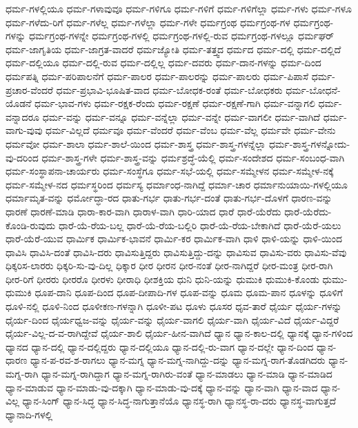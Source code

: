 {ಧರ್ಮ-ಗಳಲ್ಲಿಯೂ
ಧರ್ಮ-ಗಳಾವುವೂ
ಧರ್ಮ-ಗಳಿಗೂ
ಧರ್ಮ-ಗಳಿಗೆ
ಧರ್ಮ-ಗಳಿಗೆಲ್ಲಾ
ಧರ್ಮ-ಗಳು
ಧರ್ಮ-ಗಳೂ
ಧರ್ಮ-ಗಳೆದು-ರಿಗೆ
ಧರ್ಮ-ಗಳೆಲ್ಲ
ಧರ್ಮ-ಗಳೆಲ್ಲಾ
ಧರ್ಮ-ಗಳೇ
ಧರ್ಮಗ್ರಂಥ
ಧರ್ಮಗ್ರಂಥ-ಗಳ
ಧರ್ಮಗ್ರಂಥ-ಗಳನ್ನು
ಧರ್ಮಗ್ರಂಥ-ಗಳನ್ನೇ
ಧರ್ಮಗ್ರಂಥ-ಗಳಲ್ಲಿ
ಧರ್ಮಗ್ರಂಥ-ಗಳಲ್ಲಿ-ರುವ
ಧರ್ಮಗ್ರಂಥ-ಗಳಲ್ಲೂ
ಧರ್ಮಘರ್
ಧರ್ಮ-ಜಾಗೃತಿಯ
ಧರ್ಮ-ಜಾಗ್ರತ-ವಾದರೆ
ಧರ್ಮಜ್ಯೋತಿ
ಧರ್ಮ-ತತ್ತ್ವದ
ಧರ್ಮದ
ಧರ್ಮ-ದಲ್ಲಿ
ಧರ್ಮ-ದಲ್ಲಿದೆ
ಧರ್ಮ-ದಲ್ಲಿಯೂ
ಧರ್ಮ-ದಲ್ಲಿ-ರುವ
ಧರ್ಮ-ದಲ್ಲಿಲ್ಲ
ಧರ್ಮ-ದವರು
ಧರ್ಮ-ದಾನ-ಗಳನ್ನು
ಧರ್ಮ-ದಿಂದ
ಧರ್ಮಪತ್ನಿ
ಧರ್ಮ-ಪರಿಪಾಲನೆಗೆ
ಧರ್ಮ-ಪಾಲರ
ಧರ್ಮ-ಪಾಲರನ್ನು
ಧರ್ಮ-ಪಾಲರು
ಧರ್ಮ-ಪಿಪಾಸೆ
ಧರ್ಮ-ಪ್ರಚಾರ-ವೆಂದರೆ
ಧರ್ಮ-ಪ್ರಭಾವಿ-ಭೂಷಿತ-ವಾದ
ಧರ್ಮ-ಬೋಧಕ-ರಂತೆ
ಧರ್ಮ-ಬೋಧಕರು
ಧರ್ಮ-ಬೋಧನೆ-ಯೊಡನೆ
ಧರ್ಮ-ಭಾವ-ಗಳು
ಧರ್ಮ-ರಕ್ಷಕ-ರೆಂದು
ಧರ್ಮ-ರಕ್ಷಣೆ
ಧರ್ಮ-ರಕ್ಷಣೆ-ಗಾಗಿ
ಧರ್ಮ-ವನ್ನಾಗಲಿ
ಧರ್ಮ-ವನ್ನಾದರೂ
ಧರ್ಮ-ವನ್ನು
ಧರ್ಮ-ವನ್ನೂ
ಧರ್ಮ-ವನ್ನೆಲ್ಲಾ
ಧರ್ಮ-ವನ್ನೇ
ಧರ್ಮ-ವಾಗಲೀ
ಧರ್ಮ-ವಾಗಿದೆ
ಧರ್ಮ-ವಾಗು-ವುವು
ಧರ್ಮ-ವಿಲ್ಲದೆ
ಧರ್ಮವೂ
ಧರ್ಮ-ವೆಂದರೆ
ಧರ್ಮ-ವೆಂಬ
ಧರ್ಮ-ವೆಲ್ಲ
ಧರ್ಮವೇ
ಧರ್ಮ-ವೇನು
ಧರ್ಮವೋ
ಧರ್ಮ-ಶಾಲಾ
ಧರ್ಮ-ಶಾಲೆ-ಯಿಂದ
ಧರ್ಮ-ಶಾಸ್ತ್ರ
ಧರ್ಮ-ಶಾಸ್ತ್ರ-ಗಳನ್ನೆಲ್ಲಾ
ಧರ್ಮ-ಶಾಸ್ತ್ರ-ಗಳನ್ನೋದು-ವು-ದರಿಂದ
ಧರ್ಮ-ಶಾಸ್ತ್ರ-ಗಳೇ
ಧರ್ಮ-ಶಾಸ್ತ್ರ-ವನ್ನು
ಧರ್ಮಶ್ರದ್ಧೆ-ಯೆಲ್ಲಿ
ಧರ್ಮ-ಸಂದೇಶದ
ಧರ್ಮ-ಸಂಬಂಧ-ವಾಗಿ
ಧರ್ಮ-ಸಂಸ್ಥಾಪನಾ-ಚಾರ್ಯರು
ಧರ್ಮ-ಸಂಸ್ಥೆಗೂ
ಧರ್ಮ-ಸಭೆ-ಯಲ್ಲಿ
ಧರ್ಮ-ಸಮ್ಮೇಳನ
ಧರ್ಮ-ಸಮ್ಮೇಳ-ನಕ್ಕೆ
ಧರ್ಮ-ಸಮ್ಮೇಳ-ನದ
ಧರ್ಮಸ್ಥರಿಂದ
ಧರ್ಮಸ್ಯ
ಧರ್ಮಾಂಧ-ನಾಗಿದ್ದೆ
ಧರ್ಮಾ-ಚಾರ
ಧರ್ಮಾನುಯಾಯಿ-ಗಳಲ್ಲಿಯೂ
ಧರ್ಮಾಮೃತ-ವನ್ನು
ಧರ್ಮೋದ್ಧಾ-ರದ
ಧಾತು-ಗರ್ಭ
ಧಾತು-ಗರ್ಭ-ದಂತೆ
ಧಾತು-ಗರ್ಭ-ದೊಳಗೆ
ಧಾರಣ-ವನ್ನು
ಧಾರಣೆ
ಧಾರಣೆ-ಮಾಡಿ
ಧಾರಾ-ಕಾರ-ವಾಗಿ
ಧಾರಾಳ-ವಾಗಿ
ಧಾರಿ-ಯಾದ
ಧಾರೆ
ಧಾರೆ-ಯೆರೆದು
ಧಾರೆ-ಯೆರೆದು-ಕೊಂಡಿ-ರುವುದು
ಧಾರೆ-ಯೆ-ರೆಯ-ಬಲ್ಲ
ಧಾರೆ-ಯೆ-ರೆಯ-ಬಲ್ಲಿರಿ
ಧಾರೆ-ಯೆ-ರೆಯ-ಬೇಕಾಗಿದೆ
ಧಾರೆ-ಯೆರೆ-ಯಲು
ಧಾರೆ-ಯೆರೆ-ಯುವ
ಧಾರ್ಮಿಕ
ಧಾರ್ಮಿಕ-ಭಾವನೆ
ಧಾರ್ಮಿ-ಕರ
ಧಾರ್ಮಿಕ-ವಾಗಿ
ಧಾಳಿ
ಧಾಳಿ-ಯನ್ನು
ಧಾಳಿ-ಯಿಂದ
ಧಾವಿಸಿ
ಧಾವಿಸಿ-ದಂತೆ
ಧಾವಿಸಿ-ದರು
ಧಾವಿಸುತ್ತಿದ್ದರು
ಧಾವಿಸುತ್ತಿದ್ದು-ದನ್ನು
ಧಾವಿಸುವ
ಧಾವಿಸು-ವರು
ಧಾವಿಸು-ವೆವು
ಧಿಕ್ಕರಿಸ-ಲಾರರು
ಧಿಕ್ಕರಿ-ಸು-ವು-ದಿಲ್ಲ
ಧಿಕ್ಕಾರ
ಧೀರ
ಧೀರನ
ಧೀರ-ನಂತೆ
ಧೀರ-ನಾಗಿದ್ದರೆ
ಧೀರ-ಮಂತ್ರ
ಧೀರ-ರಾಗಿ
ಧೀರ-ರಿಗೆ
ಧೀರರು
ಧೀರರೊ
ಧೀರಳು
ಧೀರಾಧಿ
ಧೀಶಕ್ತಿಯ
ಧುನಿ
ಧುನಿ-ಯನ್ನು
ಧುಮುಕಿ
ಧುಮುಕಿ-ಕೊಂಡು
ಧುಮು-ಧುಮುಕಿ
ಧೂಪ-ದಾನಿ
ಧೂಪ-ದಿಂದ
ಧೂಪ-ದೀಪಾದಿ-ಗಳ
ಧೂಪ-ವನ್ನು
ಧೂಮ
ಧೂಮ-ಪಾನ
ಧೂಳನ್ನು
ಧೂಳಿಗೆ
ಧೂಳಿ-ನಲ್ಲಿ
ಧೂಳಿ-ನಿಂದ
ಧೂಳೀಕಣ-ಗಳನ್ನಾಗಿ
ಧೂಳೀ-ಪಟ
ಧೂಳು
ಧೂಸರ
ಧೃವ-ತಾರೆ
ಧೈರ್ಯ
ಧೈರ್ಯ-ಗಳನ್ನು
ಧೈರ್ಯ-ದಿಂದ
ಧೈರ್ಯಧ್ವಜ-ವನ್ನು
ಧೈರ್ಯ-ವನ್ನು
ಧೈರ್ಯ-ವಾಗಲಿ
ಧೈರ್ಯ-ವಾಗಿ
ಧೈರ್ಯ-ವಿದೆ
ಧೈರ್ಯ-ವಿದ್ದರೆ
ಧೈರ್ಯ-ವಿಲ್ಲ-ದ-ವ-ರಾಗಿದ್ದೇವೆ
ಧೈರ್ಯ-ಶಾಲಿ
ಧೈರ್ಯ-ಹೀನ-ವಾಗಿದೆ
ಧ್ಯಾನ
ಧ್ಯಾನ-ಕಾಲ-ದಲ್ಲಿ
ಧ್ಯಾನಕ್ಕೆ
ಧ್ಯಾನ-ಗಳಿಂದ
ಧ್ಯಾನದ
ಧ್ಯಾನ-ದಲ್ಲಿ
ಧ್ಯಾನ-ದಲ್ಲಿದ್ದರು
ಧ್ಯಾನ-ದಲ್ಲಿಯೂ
ಧ್ಯಾನ-ದಲ್ಲಿ-ರು-ವಾಗ
ಧ್ಯಾನ-ದಲ್ಲೇ
ಧ್ಯಾನ-ದಿಂದ
ಧ್ಯಾನ-ಧಾರಣ
ಧ್ಯಾನ-ಪ-ರವ-ಶ-ರಾಗಲು
ಧ್ಯಾನ-ಮಗ್ನ
ಧ್ಯಾನ-ಮಗ್ನ-ನಾಗಿದ್ದು-ದನ್ನು
ಧ್ಯಾನ-ಮಗ್ನ-ರಾಗ-ತೊಡಗಿದರು
ಧ್ಯಾನ-ಮಗ್ನ-ರಾಗಿ
ಧ್ಯಾನ-ಮಗ್ನ-ರಾಗಿದ್ದಾಗ
ಧ್ಯಾನ-ಮಗ್ನ-ರಾಗಿರು-ವಂತೆ
ಧ್ಯಾನ-ಮಾಡಲು
ಧ್ಯಾನ-ಮಾಡಿ
ಧ್ಯಾನ-ಮಾಡಿದ
ಧ್ಯಾನ-ಮಾಡುವ
ಧ್ಯಾನ-ಮಾಡು-ವು-ದಕ್ಕಾಗಿ
ಧ್ಯಾನ-ಮಾಡು-ವು-ದಕ್ಕೆ
ಧ್ಯಾನ-ವನ್ನು
ಧ್ಯಾನ-ವಾಗಿ
ಧ್ಯಾನ-ವಾದ
ಧ್ಯಾನ-ವಿಲ್ಲ
ಧ್ಯಾನ-ಸಿಂಗ್
ಧ್ಯಾನ-ಸಿದ್ಧ
ಧ್ಯಾನ-ಸಿದ್ಧ-ನಾಗುತ್ತಾನೆಯೊ
ಧ್ಯಾನಸ್ಥ-ರಾಗಿ
ಧ್ಯಾನಸ್ಥ-ರಾ-ದರು
ಧ್ಯಾನಸ್ಥ-ವಾಗುತ್ತದೆ
ಧ್ಯಾನಾದಿ-ಗಳಲ್ಲಿ
}
